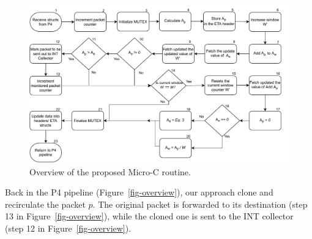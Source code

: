 \begin{figure}[t]
\centering
        \includegraphics[scale=0.4]{aina-img/apf_micro_c.pdf}
        \caption{Overview of the proposed Micro-C routine.}
        \label{fig-overview-microc}
\end{figure}

Back in the P4 pipeline (Figure~\ref{fig-overview}), our approach clone and recirculate the packet $p$. The original packet is forwarded to its destination (step 13 in Figure~\ref{fig-overview}), while the cloned one is sent to the INT collector (step 12 in Figure~\ref{fig-overview}).







